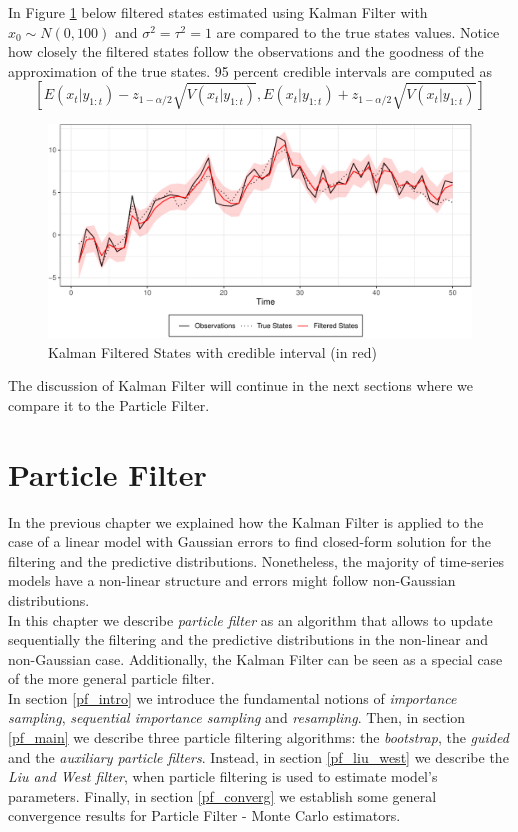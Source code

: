 \documentclass[
]{book}
\theoremstyle{break}
\theoremstyle{nonumberplain}
\begin{document}
In Figure \ref{fig:myfig2} below filtered states estimated using Kalman
Filter with \(x_{0} \sim N(0,100)\) and \(\sigma^{2}=\tau^{2}=1\) are
compared to the true states values. Notice how closely the filtered
states follow the observations and the goodness of the approximation of
the true states. 95 percent credible intervals are computed as
\[[E(x_{t}|y_{1:t})-z_{1-\alpha/2}\sqrt{V(x_{t}|y_{1:t})},E(x_{t}|y_{1:t})+z_{1-\alpha/2}\sqrt{V(x_{t}|y_{1:t})}]\]

\begin{figure}[H]

{\centering \includegraphics{prova_knit_finale_files/figure-latex/myfig2-1} 

}

\caption{Kalman Filtered States with credible interval (in red)}\label{fig:myfig2}
\end{figure}

The discussion of Kalman Filter will continue in the next sections where
we compare it to the Particle Filter.

\chapter{Particle Filter}\label{PF_chapter}

In the previous chapter we explained how the Kalman Filter is applied to
the case of a linear model with Gaussian errors to find closed-form
solution for the filtering and the predictive distributions.
Nonetheless, the majority of time-series models have a non-linear
structure and errors might follow non-Gaussian distributions.\\
In this chapter we describe \textit{particle filter} as an algorithm
that allows to update sequentially the filtering and the predictive
distributions in the non-linear and non-Gaussian case. Additionally, the
Kalman Filter can be seen as a special case of the more general particle
filter.\\
In section \ref{pf_intro} we introduce the fundamental notions of
\textit{importance sampling}, \textit{sequential importance sampling}
and \textit{resampling}. Then, in section \ref{pf_main} we describe
three particle filtering algorithms: the \textit{bootstrap}, the
\textit{guided} and the \textit{auxiliary particle filters}. Instead, in
section \ref{pf_liu_west} we describe the \textit{Liu and West filter},
when particle filtering is used to estimate model's parameters. Finally,
in section \ref{pf_converg} we establish some general convergence
results for Particle Filter - Monte Carlo estimators.
\end{document}
